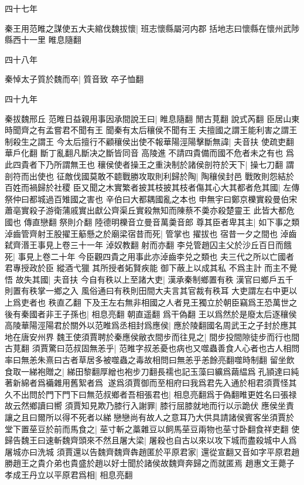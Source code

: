 四十七年


秦王用范睢之謀使五大夫綰伐魏拔懷|{
	班志懷縣屬河内郡
	括地志曰懷縣在懷州武陟縣西十一里
	睢息隨翻
	}


四十八年


秦悼太子質於魏而卒|{
	質音致
	卒子恤翻
	}


四十九年

秦拔魏邢丘
范睢日益親用事因承間說王曰|{
	睢息隨翻
	閒古莧翻
	說式芮翻
	}
臣居山東時聞齊之有孟嘗君不聞有王
聞秦有太后穰侯不聞有王
夫擅國之謂王能利害之謂王制殺生之謂王
今太后擅行不顧穰侯出使不報華陽涇陽擊斷無諱|{
	夫音扶
	使疏吏翻
	華戶化翻
	斷丁亂翻凡斷决之斷皆同音
	}
高陵進不請四貴備而國不危者未之有也
爲此四貴者下乃所謂無王也
穰侯使者操王之重決制於諸侯剖符於天下|{
	操七刀翻
	謂剖符而出使也}
征敵伐國莫敢不聼戰勝攻取則利歸於陶|{
	陶穰侯封邑}
戰敗則怨結於百姓而禍歸於社稷
臣又聞之木實繁者披其枝披其枝者傷其心大其都者危其國|{
	左傳祭仲曰都城過百雉國之害也
	辛伯曰大都耦國亂之本也
	申無宇曰鄭京櫟實殺曼伯宋蕭亳實殺子游衛蒲戚實出獻公齊渠丘實殺無知而陳蔡不羮亦殺楚靈王
	此皆大都危國也
	傳直戀翻
	祭則介翻
	陸德明櫟音立曼音萬羮音郎}
尊其臣者卑其主|{
	如下事之類}
淖齒管齊射王股擢王䈥懸之於廟梁宿昔而死|{
	管掌也
	擢拔也
	宿昔一夕之間也
	淖齒弑齊湣王事見上卷三十一年
	淖奴教翻
	射而亦翻
	}
李兑管趙囚主父於沙丘百日而餓死|{
	事見上卷二十年}
今臣觀四貴之用事此亦淖齒李兑之類也
夫三代之所以亡國者
君專授政於臣
縱酒弋獵
其所授者妬賢疾能
御下蔽上以成其私
不爲主計
而主不覺悟
故失其國|{
	夫音扶}
今自有秩以上至諸大吏|{
	漢承秦制鄉置有秩
	漢官曰鄉戶五千則置有秩掌一鄉之入
	風俗通曰有秩則田間大夫言其官裁有秩耳
	大吏謂左右中更以上爲吏者也
	秩直乙翻
	}
下及王左右無非相國之人者見王獨立於朝臣竊爲王恐萬世之後有秦國者非王子孫也|{
	相息亮翻
	朝直遥翻
	爲干偽翻
	}
王以爲然於是廢太后逐穰侯高陵華陽涇陽君於關外以范睢爲丞相封爲應侯|{
	應於陵翻國名周武王之子封於應其地在唐安州界}
魏王使須賈聘於秦應侯敝衣間步而往見之|{
	間步投間隙徒步而行也間古莧翻}
須賈驚曰范叔固無恙乎|{
	范睢字叔恙憂也病也又噬蟲善食人心者也古人相問率曰無恙朱熹曰古者草居多被噬蟲之毒故相問曰無恙乎恙餘亮翻噬時制翻}
留坐飲食取一綈袍贈之|{
	綈田黎翻厚繒也袍步刀翻長襦也記玉藻曰纊爲繭緼爲孔頴達曰純著新綿者爲襺雜用舊絮者爲}
遂爲須賈御而至相府曰我爲君先入通於相君須賈怪其久不出問於門下門下曰無范叔鄉者吾相張君也|{
	相息亮翻爲于偽翻睢更姓名曰張禄故云然鄉讀曰嚮}
須賈知見欺乃膝行入謝罪|{
	膝行屈膝就地而行以示跪伏}
應侯坐責讓之且曰爾所以得不死者以綈戀戀尚有故人之意耳乃大供具請諸侯賓客坐須賈於堂下置莝豆於前而馬食之|{
	莝寸斬之藁雜豆以飼馬莝豆兩物也莝寸卧翻食祥吏翻}
使歸告魏王曰速斬魏齊頭來不然且屠大梁|{
	屠殺也自古以來以攻下城而盡殺城中人爲屠城亦曰洗城}
須賈還以告魏齊魏齊犇趙匿於平原君家|{
	還從宣翻又音如字平原君趙勝趙王之貴介弟也貴盛於趙以好士聞於諸侯故魏齊奔歸之而就匿焉}
趙惠文王薨子孝成王丹立以平原君爲相|{
	相息亮翻}



